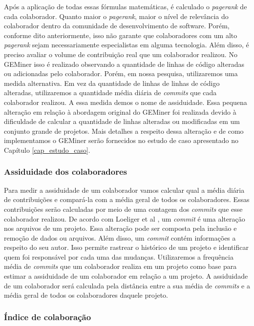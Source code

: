 Após a aplicação de todas essas fórmulas matemáticas, é calculado o \textit{pagerank} de cada colaborador. Quanto maior o \textit{pagerank}, maior o nível de relevância do colaborador dentro da comunidade de desenvolvimento de software. Porém, conforme dito anteriormente, isso não garante que colaboradores com um alto \textit{pagerank} sejam necessariamente especialistas em alguma tecnologia. Além disso, é preciso avaliar o volume de contribuição real que um colaborador realizou. No GEMiner isso é realizado observando a quantidade de linhas de código alteradas ou adicionadas pelo colaborador. Porém, em nossa pesquisa, utilizaremos uma medida alternativa. Em vez da quantidade de linhas de linhas de código alteradas, utilizaremos a quantidade média diária de \textit{commits} que cada colaborador realizou. A essa medida demos o nome de assiduidade. Essa pequena alteração em relação à abordagem original do GEMiner foi realizada devido à dificuldade de calcular a quantidade de linhas alteradas ou modificadas em um conjunto grande de projetos. Mais detalhes a respeito dessa alteração e de como implementamos o GEMiner serão fornecidos no estudo de caso apresentado no Capítulo \ref{cap_estudo_caso}.

\subsubsection{Assiduidade dos colaboradores}

Para medir a assiduidade de um colaborador vamos calcular qual a média diária de contribuições e compará-la com a média geral de todos os colaboradores. Essas contribuições serão calculadas por meio de uma contagem dos \textit{commits} que esse colaborador realizou.  De acordo com Loeliger et al \cite{loeliger2012version}, um \textit{commit} é uma alteração nos arquivos de um projeto. Essa alteração pode ser composta pela inclusão e remoção de dados ou arquivos. Além disso, um \textit{commit} contém informações a respeito do seu autor. Isso permite rastrear o histórico de um projeto e identificar quem foi responsável por cada uma das mudanças.  Utilizaremos a frequência média de \textit{commits} que um colaborador realiza em um projeto como base para estimar a assiduidade de um colaborador em relação a um projeto. A assiduidade de um colaborador será calculada pela distância entre a sua média de \textit{commits} e a média geral de todos os colaboradores daquele projeto.



\subsubsection{Índice de colaboração}


